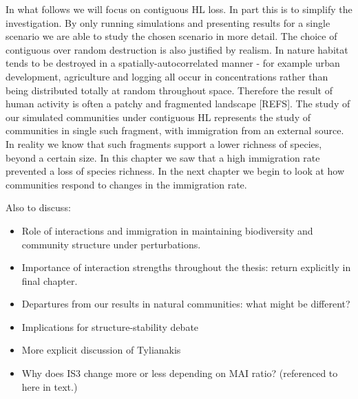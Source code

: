 In what follows we will focus on contiguous HL loss. In part this is to simplify the investigation. By only running simulations and presenting results for a single scenario we are able to study the chosen scenario in more detail. The choice of contiguous over random destruction is also justified by realism. In nature habitat tends to be destroyed in a spatially-autocorrelated manner - for example urban development, agriculture and logging all occur in concentrations rather than being distributed totally at random throughout space. Therefore the result of human activity is often a patchy and fragmented landscape [REFS]. The study of our simulated communities under contiguous HL represents the study of communities in single such fragment, with immigration from an external source. In reality we know that such fragments support a lower richness of species, beyond a certain size. In this chapter we saw that a high immigration rate prevented a loss of species richness. In the next chapter we begin to look at how communities respond to changes in the immigration rate.

Also to discuss:
\begin{itemize}
	\item Role of interactions and immigration in maintaining biodiversity and community structure under perturbations.
	
	\item Importance of interaction strengths throughout the thesis: return explicitly in final chapter. 
	
	\item Departures from our results in natural communities: what might be different?
	
	\item Implications for structure-stability debate
	
	\item More explicit discussion of Tylianakis 
	
	\item Why does IS3 change more or less depending on MAI ratio? (referenced to here in text.)
\end{itemize}  



